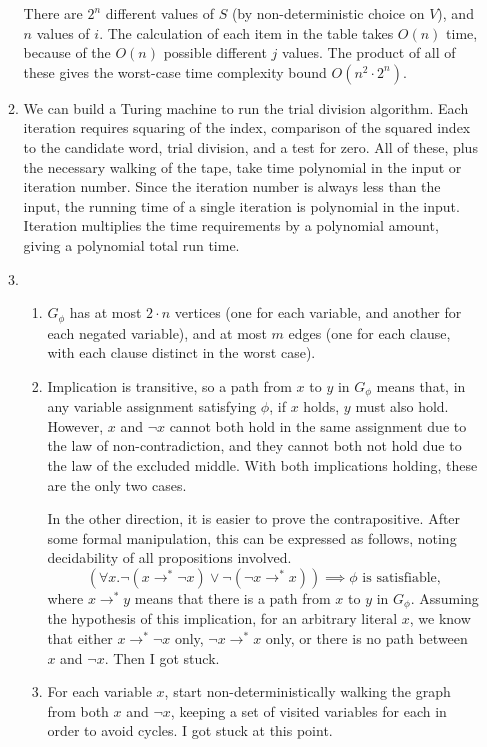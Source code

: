 \documentclass{article}
\begin{document}
\begin{enumerate}
\begin{enumerate}[label=\arabic{enumii}.]
        There are $2^n$ different values of $S$ (by non-deterministic choice on $V$), and $n$ values of $i$. The calculation of each item in the table takes $O(n)$ time, because of the $O(n)$ possible different $j$ values. The product of all of these gives the worst-case time complexity bound $O(n^2 \cdot 2^n)$.
      \item We can build a Turing machine to run the trial division algorithm. Each iteration requires squaring of the index, comparison of the squared index to the candidate word, trial division, and a test for zero. All of these, plus the necessary walking of the tape, take time polynomial in the input or iteration number. Since the iteration number is always less than the input, the running time of a single iteration is polynomial in the input. Iteration multiplies the time requirements by a polynomial amount, giving a polynomial total run time.
      \item
        \begin{enumerate}[label=(\alph{enumiii})]
          \item $G_\phi$ has at most $2 \cdot n$ vertices (one for each variable, and another for each negated variable), and at most $m$ edges (one for each clause, with each clause distinct in the worst case).
          \item
            Implication is transitive, so a path from $x$ to $y$ in $G_\phi$ means that, in any variable assignment satisfying $\phi$, if $x$ holds, $y$ must also hold. However, $x$ and $\neg x$ cannot both hold in the same assignment due to the law of non-contradiction, and they cannot both not hold due to the law of the excluded middle. With both implications holding, these are the only two cases.

            In the other direction, it is easier to prove the contrapositive. After some formal manipulation, this can be expressed as follows, noting decidability of all propositions involved.
            \[
              (\forall x. \neg(x \to^* \neg x) \vee \neg(\neg x \to^* x)) \implies \phi\textrm{ is satisfiable,}
            \]
            where $x \to^* y$ means that there is a path from $x$ to $y$ in $G_\phi$. Assuming the hypothesis of this implication, for an arbitrary literal $x$, we know that either $x \to^* \neg x$ only, $\neg x \to^* x$ only, or there is no path between $x$ and $\neg x$. Then I got stuck.
          \item For each variable $x$, start non-deterministically walking the graph from both $x$ and $\neg x$, keeping a set of visited variables for each in order to avoid cycles. I got stuck at this point.


\end{enumerate}
\end{enumerate}
\end{enumerate}
\end{document}
